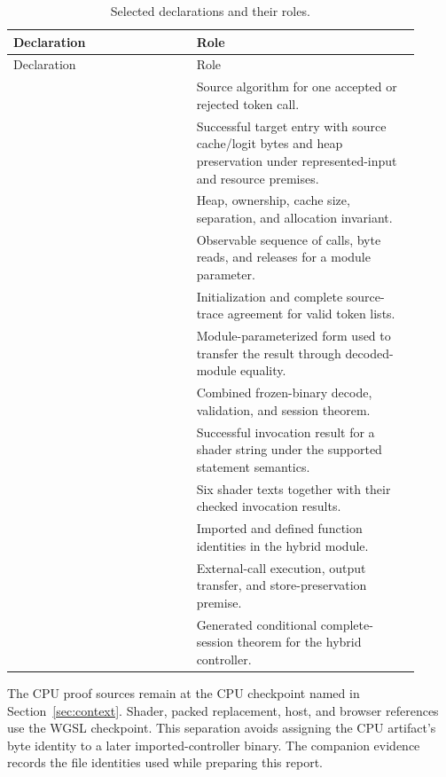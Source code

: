 \begin{longtable}{L{0.41\linewidth}L{0.50\linewidth}}
\caption{Selected declarations and their roles.}\\
\toprule
Declaration & Role\\
\midrule
\endfirsthead
\toprule Declaration & Role\\\midrule
\endhead
{} & Source algorithm for one accepted or rejected token call.\\
 & Successful target entry with source cache/logit bytes and heap preservation under represented-input and resource premises.\\
 & Heap, ownership, cache size, separation, and allocation invariant.\\
 & Observable sequence of calls, byte reads, and releases for a module parameter.\\
 & Initialization and complete source-trace agreement for valid token lists.\\
 & Module-parameterized form used to transfer the result through decoded-module equality.\\
 & Combined frozen-binary decode, validation, and session theorem.\\
 & Successful invocation result for a shader string under the supported statement semantics.\\
 & Six shader texts together with their checked invocation results.\\
 & Imported and defined function identities in the hybrid module.\\
 & External-call execution, output transfer, and store-preservation premise.\\
 & Generated conditional complete-session theorem for the hybrid controller.\\
\bottomrule
\end{longtable}

The CPU proof sources remain at the CPU checkpoint named in Section~\ref{sec:context}.  Shader, packed replacement, host, and browser references use the WGSL checkpoint.  This separation avoids assigning the CPU artifact's byte identity to a later imported-controller binary.  The companion evidence records the file identities used while preparing this report.


